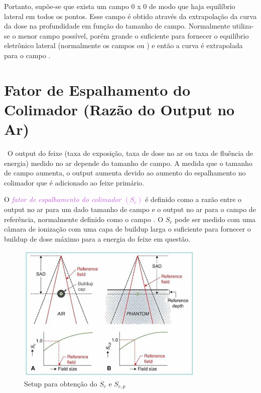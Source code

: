 \documentclass[11pt,a4paper]{article}
\begin{document}
    Portanto, supõe-se que exista um campo 0 x 0 de modo que haja equilíbrio lateral em todos os pontos. Esse campo é obtido através da extrapolação da curva da dose na profundidade em função do tamanho de campo. Normalmente utiliza-se o menor campo possível, porém grande o suficiente para fornecer o equilíbrio eletrônico lateral (normalmente os campos  ou ) e então a curva é extrapolada para o campo .

    \section{Fator de Espalhamento do Colimador (Razão do Output no Ar)}
\
    O output do feixe (taxa de exposição, taxa de dose no ar ou taxa de fluência de energia) medido no ar depende do tamanho de campo. A medida que o tamanho de campo aumenta, o output aumenta devido ao aumento do espalhamento no colimador que é adicionado ao feixe primário.

    O \textit{\textcolor{MediumOrchid}{fator de espalhamento do colimador $(S_c)$}} é definido como a razão entre o output no ar para um dado tamanho de campo e o output no ar para o campo de referência, normalmente definido como o campo . O $S_c$ pode ser medido com uma câmara de ionização com uma capa de buildup larga o suficiente para fornecer o buildup de dose máximo para a energia do feixe em questão. 
    
    \begin{figure}[h]
        \centering
        \includegraphics[width=0.8\textwidth]{Imagens/scEScp.JPG}
        \caption{Setup para obtenção do $S_c$ e $S_{c,p}$}
        \label{fig:scEScp}                
    \end{figure}
\end{document}
